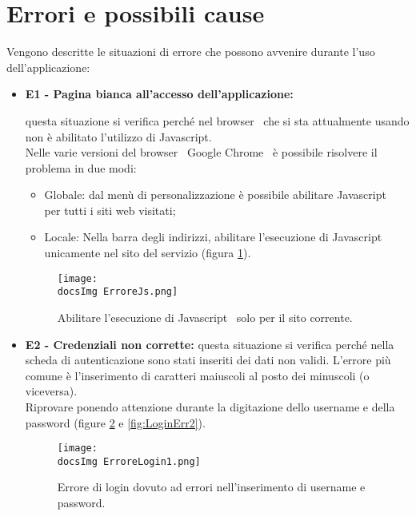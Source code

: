 \section{Errori e possibili cause} \label{errori} {

Vengono descritte le situazioni di errore che possono avvenire durante l'uso dell'applicazione:
\begin{itemize}
	\item \textbf{E1 - Pagina bianca all'accesso dell'applicazione: }{
		questa situazione si verifica perché nel browser\g~ che si sta attualmente usando non è abilitato l'utilizzo di Javascript\g .\\
		Nelle varie versioni del browser\g~ Google Chrome\g~ è possibile risolvere il problema in due modi:
		\begin{itemize}
			\item Globale: dal menù di personalizzazione è possibile abilitare Javascript\g~ per tutti i siti web visitati;
			\item Locale: Nella barra degli indirizzi, abilitare l'esecuzione di Javascript\g~ unicamente nel sito del servizio (figura \ref{fig:JSErr}).
		\end{itemize}
	}

	\begin{center}
		\begin{figure}[h!]
		\centering
		\texttt{[image: \\docsImg ErroreJs.png]}
		\caption{Abilitare l'esecuzione di Javascript\g~ solo per il sito corrente.}
		\label{fig:JSErr}
		\end{figure}
	\end{center}

	\item \textbf{E2 - Credenziali non corrette: }{
		questa situazione si verifica perché nella scheda di autenticazione sono stati inseriti dei dati non validi. L'errore più comune è l'inserimento di caratteri maiuscoli al posto dei minuscoli (o viceversa).\\
		Riprovare ponendo attenzione durante la digitazione dello username e della password (figure \ref{fig:LoginErr1} e \ref{fig:LoginErr2}).
	}

\begin{center}
\begin{figure}[h!]
	\centering
	\texttt{[image: \\docsImg ErroreLogin1.png]}
	\caption{Errore di login dovuto ad errori nell'inserimento di username e password.}
	\label{fig:LoginErr1}
\end{figure}
\end{center}


\end{itemize}}
